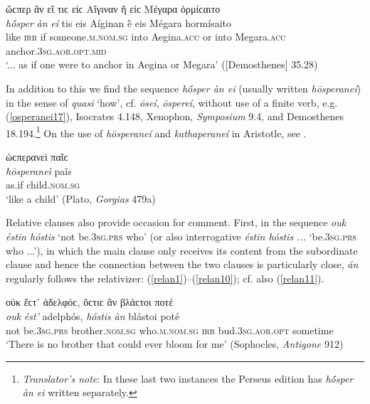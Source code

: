 \begin{exe}
\ex ὥϲπερ ἂν εἴ τιϲ εἰϲ Αἴγιναν ἢ εἰϲ Μέγαρα ὁρμίϲαιτο\\
\gll \emph{hṓsper} \emph{àn} \emph{eí} tis eis Aíginan ḕ eis Mégara hormísaito\\
like \textsc{irr} if someone.\textsc{m.nom.sg} into Aegina.\textsc{acc} or into Megara.\textsc{acc} anchor.\textsc{3sg.aor.opt.mid}\\
\trans `... as if one were to anchor in Aegina or Megara' ({[}Demosthenes{]} 35.28)
\label{osperanei16}
\end{exe}

\largerpage[-2]
In addition to this we find the sequence \emph{hṓsper àn ei} (usually written \emph{hōsperaneí}) in the sense of \emph{quasi} `how', cf. \emph{ōseí}, \emph{ōspereí}, without use of a finite verb, e.g. (\ref{osperanei17}), Isocrates 4.148, Xenophon, \textit{Symposium} 9.4, and Demosthenes 18.194.\footnote{\emph{Translator's note}: In these last two instances the Perseus edition has \textit{hṓsper àn ei} written separately.} On the use of \emph{hōsperaneí} and \emph{kathaperaneí} in Aristotle, see \citet[41]{Bonitz1870}.

\begin{exe}
\ex ὡϲπερανεὶ παῖϲ\\
\gll \emph{hōsperaneì} paîs\\
as.if child.\textsc{nom.sg}\\
\trans `like a child' (Plato, \textit{Gorgias} 479a)
\label{osperanei17}
\end{exe}

Relative clauses also provide occasion for comment. First, in the sequence \emph{ouk éstin hóstis} `not be.\textsc{3sg.prs} who' (or also interrogative \emph{éstin hóstis ...} `be.\textsc{3sg.prs} who ...'), in which the main clause only receives its content from the subordinate clause and hence the connection between the two clauses is particularly close, \emph{án} regularly follows the relativizer: (\ref{relan1})--(\ref{relan10}); cf. also (\ref{relan11}).

\begin{exe}
\ex οὐκ ἔϲτ᾽ ἀδελφόϲ, ὅϲτιϲ ἂν βλάϲτοι ποτέ\\
\gll \emph{ouk} \emph{ést'} adelphós, \emph{hóstis} \emph{àn} blástoi poté\\
not be.\textsc{3sg.prs} brother.\textsc{nom.sg} who.\textsc{m.nom.sg}
\textsc{irr} bud.\textsc{3sg.aor.opt} sometime\\
\trans `There is no brother that could ever bloom for me' (Sophocles, \textit{Antigone} 912)
\label{relan1}
\end{exe}

